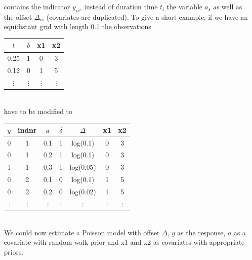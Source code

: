 \documentclass[11pt,a4paper,twoside]{bayesxarticle}
\begin{document}
contains the indicator $y_{is}$, instead of duration time $t_i$
the variable $a_s$ as well as the offset $\Delta_{is}$ (covariates
are duplicated). To give a short example, if we have an
equidistant grid with length 0.1 the observations
\vspace{0.5cm}\\
\begin{tabular}{c|c|c|c}
  $t$ &   $\delta$ &  x1 &  x2\\\hline\hline
0.25  &  1  &    0  &  3\\\hline 0.12  &  0  &    1  &  5\\\hline
$\vdots$ & $\vdots$ & $\vdots$ & $\vdots$ \\
\end{tabular}
\vspace{0.5cm}\\
have to be modified to
\vspace{0.5cm}\\
\begin{tabular}{c|c|c|c|c|c|c}
$y$ & indnr & $a$& $\delta$ &  $\Delta$ &   x1 & x2\\\hline\hline
0 &  1 &   0.1 &   1  &  log(0.1) & 0  & 3\\
0  & 1   & 0.2  &  1  &  log(0.1) & 0 &  3\\
1  & 1   & 0.3  &  1  &  log(0.05)& 0  & 3\\\hline
0 &  2 &   0.1 &   0 &   log(0.1) & 1 &  5\\
0  & 2  &  0.2 &   0  &  log(0.02)& 1 &  5\\\hline
$\vdots$ & $\vdots$ & $\vdots$ & $\vdots$ & $\vdots$ & $\vdots$& $\vdots$\\
\end{tabular}
\vspace{0.5cm}\\
We could now estimate a Poisson model with offset $\Delta$, $y$ as
the response, $a$ as a covariate with random walk prior and x1 and
x2 as covariates with appropriate priors.
\end{document}

